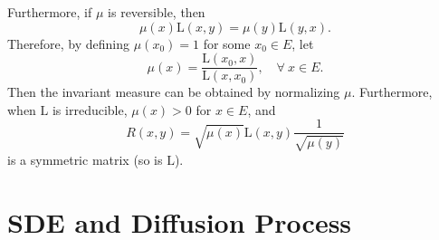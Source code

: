 \begin{enumerate}[label=\arabic{*}.]
	Furthermore, if $\mu$ is reversible, then
	\begin{equation*}
	    \mu(x) \mathrm{L}(x, y)=\mu(y) \mathrm{L}(y, x).
	\end{equation*}
	Therefore, by defining $\mu(x_0) = 1$ for some $x_0 \in E$, let
	\begin{equation*}
	    \mu(x) = \frac{\mathrm{L}(x_0,x)}{\mathrm{L}(x,x_0)},\quad \forall~x\in E.
	\end{equation*}
	Then the invariant measure can be obtained by normalizing $\mu$. Furthermore, when $\mathrm{L}$ is irreducible, $\mu(x) > 0$ for $x \in E$, and
	\begin{equation*}
		R(x, y)=\sqrt{\mu(x)} \mathrm{L}(x, y) \frac{1}{\sqrt{\mu(y)}}
	\end{equation*}
	is a symmetric matrix (so is $\mathrm{L}$).
\end{enumerate}

\section{SDE and Diffusion Process}

